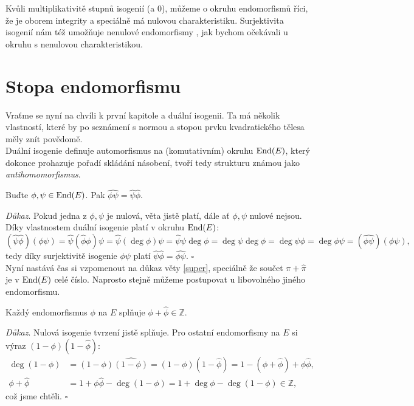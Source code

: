 \documentclass [12pt]{report}
\begin{document}
Kvůli multiplikativitě stupnů isogenií (a $0$), můžeme o okruhu endomorfismů říci, že je oborem integrity a speciálně má nulovou charakteristiku. Surjektivita isogenií nám též umožňuje nenulové endomorfismy , jak bychom očekávali u okruhu s nenulovou charakteristikou.\\

\section{Stopa endomorfismu}

Vraťme se nyní na chvíli k první kapitole a duální isogenii. Ta má několik vlastností, které by po seznámení s normou a stopou prvku kvadratického tělesa měly znít povědomě.\\

Duální isogenie definuje automorfismus na (komutativním) okruhu $\operatorname{End}(E)$, který dokonce prohazuje pořadí skládání násobení, tvoří tedy strukturu známou jako \textit{antihomomorfismus}. 

\begin{veta}\label{antiho}
Buďte $\phi, \psi \in \operatorname{End}(E)$. Pak $\widehat{\phi \psi} = \widehat{\psi} \widehat{\phi}$. 
\end{veta}
\noindent \textit{Důkaz}. Pokud jedna z $\phi,\psi$ je nulová, věta jistě platí, dále ať $\phi,\psi$ nulové nejsou. Díky vlastnostem duální isogenie platí v okruhu $\operatorname{End}(E)$:
\begin{equation*}
(\widehat{\psi} \widehat{\phi}) (\phi \psi)  = \widehat{\psi} (\widehat{\phi} \phi) \psi = \widehat{\psi}  (\deg \phi) \psi = \widehat{\psi} \psi \deg \phi = \deg \psi \deg \phi = \deg \psi \phi = \deg \phi \psi = (\widehat{\phi \psi})( \phi \psi),
\end{equation*}
tedy díky surjektivitě isogenie $\phi \psi$ platí $\widehat{\psi} \widehat{\phi} = \widehat{\phi \psi}$. \hfill $\square$\\

Nyní nastává čas si vzpomenout na důkaz věty \ref{super}, speciálně že součet $\pi+\widehat{\pi}$ je v $\operatorname{End}(E)$ celé číslo. Naprosto stejně můžeme postupovat u libovolného jiného endomorfismu.
\begin{veta}
Každý endomorfismus $\phi$ na $E$ splňuje $\phi+\widehat{\phi} \in \mathbb{Z}$.
\end{veta}
\noindent \textit{Důkaz}.  Nulová isogenie tvrzení jistě splňuje. Pro ostatní endomorfismy na $E$ si  výraz $(1 - \phi)(1 - \widehat{\phi})$:
\begin{align*}
\deg (1-\phi) &= (1-\phi)\widehat{(1-\phi)} = (1-\phi)(1-\widehat{\phi}) = 1-(\phi+\widehat{\phi})+\phi \widehat{\phi},\\
\phi+\widehat{\phi} &= 1 + \phi \widehat{\phi} - \deg (1-\phi) = 1 + \deg \phi - \deg (1-\phi) \in \mathbb{Z},
\end{align*}
což jsme chtěli. \hfill $\square$\\
\end{document}
